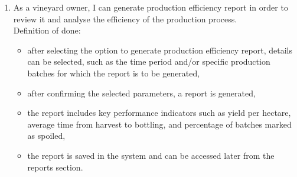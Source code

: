 \begin{enumerate}
	\item As a vineyard owner, I can generate production efficiency report in order to review it and analyse the efficiency of the production process.
	\\Definition of done:
	\begin{itemize}
		\item after selecting the option to generate production efficiency report, details can be selected, such as the time period and/or specific production batches for which the report is to be generated,
		\item after confirming the selected parameters, a report is generated,
		\item the report includes key performance indicators such as yield per hectare, average time from harvest to bottling, and percentage of batches marked as spoiled,
		\item the report is saved in the system and can be accessed later from the reports section.
	\end{itemize}
	

\end{enumerate}

